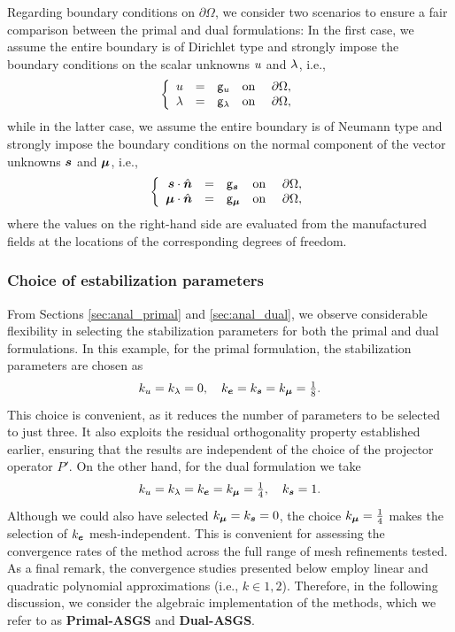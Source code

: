 Regarding boundary conditions on $\partial \Omega$, we consider two scenarios to ensure a fair comparison between the primal and dual formulations:
In the first case, we assume the entire boundary is of Dirichlet type and strongly impose the boundary conditions on the scalar unknowns $u$ and $\lambda$, i.e.,\begin{equation}
	\left\lbrace
	\begin{array}{rclll}
		u &=& \mathsf{g}_{u} &\mbox{on}&~\partial \Omega, \\
		\lambda &=& \mathsf{g}_{\lambda} &\mbox{on}&~\partial \Omega, \\
	\end{array}
	\right.
\end{equation}
while in the latter case, we assume the entire boundary is of Neumann type and strongly impose the boundary conditions on the normal component of the vector unknowns $\bm{s}$ and $\bm{\mu}$, i.e.,
\begin{equation}
	\left\lbrace
	\begin{array}{rclll}
		\bm{s} \cdot \hat{\bm{n}}  &=& \mathsf{g}_{\bm{s}} &\mbox{on}&~\partial \Omega, \\
		\bm{\mu} \cdot \hat{\bm{n}} &=& \mathsf{g}_{\bm{\mu}} &\mbox{on}&~\partial \Omega, \\
	\end{array}
	\right.
\end{equation}
where the values on the right-hand side are evaluated  from the manufactured fields
at the locations of the corresponding degrees of freedom.

\subsubsection*{Choice of estabilization parameters}

From Sections \ref{sec:anal_primal} and \ref{sec:anal_dual}, we observe considerable flexibility in selecting the stabilization parameters for both the primal and dual formulations. 
In this example, for the primal formulation, the stabilization parameters are chosen as
$$
k_{u} = k_{\lambda} = 0, 
\quad 
k_{\bm{e}} = k_{\bm{s}} = k_{\bm{\mu}} = \tfrac{1}{8}.
$$
This choice is convenient, as it reduces the number of parameters to be selected to just three. It also exploits the residual orthogonality property established earlier, ensuring that the results are independent of the choice of the projector operator $P'$.
On the other hand, for the dual formulation we take
$$
k_{u} = k_{\lambda} = k_{\bm{e}} = k_{\bm{\mu}} = \tfrac{1}{4}, 
\quad 
k_{\bm{s}} = 1.
$$
Although we could also have selected $k_{\bm{\mu}} = k_{\bm{s}} = 0$, the choice $k_{\bm{\mu}} = \tfrac{1}{4}$ makes the selection of $k_{\bm{e}}$ mesh-independent. This is convenient for assessing the convergence rates of the method across the full range of mesh refinements tested.
As a final remark, the convergence studies presented below employ linear and quadratic polynomial approximations (i.e., $k \in {1,2}$).
Therefore, in the following discussion, we consider the algebraic implementation of the methods, which we refer to as \textbf{Primal-ASGS} and \textbf{Dual-ASGS}.

